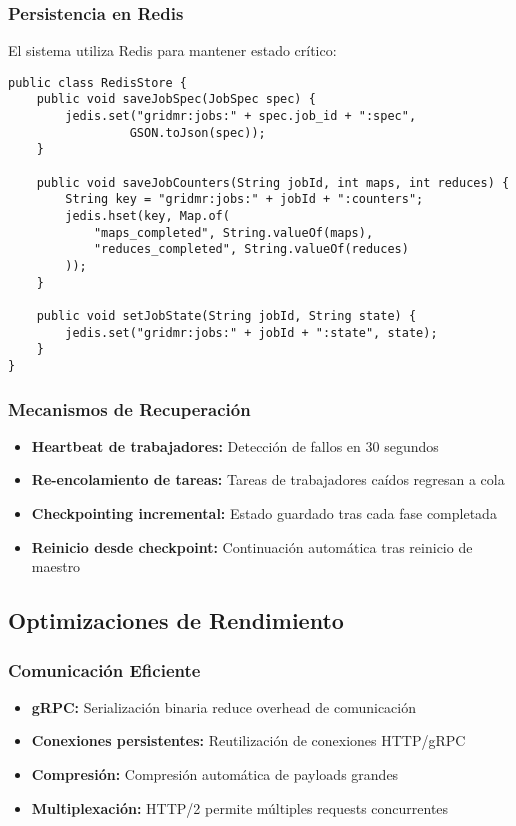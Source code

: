 \subsubsection{Persistencia en Redis}

El sistema utiliza Redis para mantener estado crítico:

\begin{verbatim}
public class RedisStore {
    public void saveJobSpec(JobSpec spec) {
        jedis.set("gridmr:jobs:" + spec.job_id + ":spec", 
                 GSON.toJson(spec));
    }
    
    public void saveJobCounters(String jobId, int maps, int reduces) {
        String key = "gridmr:jobs:" + jobId + ":counters";
        jedis.hset(key, Map.of(
            "maps_completed", String.valueOf(maps),
            "reduces_completed", String.valueOf(reduces)
        ));
    }
    
    public void setJobState(String jobId, String state) {
        jedis.set("gridmr:jobs:" + jobId + ":state", state);
    }
}
\end{verbatim}

\subsubsection{Mecanismos de Recuperación}

\begin{itemize}
    \item \textbf{Heartbeat de trabajadores:} Detección de fallos en 30 segundos
    \item \textbf{Re-encolamiento de tareas:} Tareas de trabajadores caídos regresan a cola
    \item \textbf{Checkpointing incremental:} Estado guardado tras cada fase completada
    \item \textbf{Reinicio desde checkpoint:} Continuación automática tras reinicio de maestro
\end{itemize}

\subsection{Optimizaciones de Rendimiento}

\subsubsection{Comunicación Eficiente}

\begin{itemize}
    \item \textbf{gRPC:} Serialización binaria reduce overhead de comunicación
    \item \textbf{Conexiones persistentes:} Reutilización de conexiones HTTP/gRPC
    \item \textbf{Compresión:} Compresión automática de payloads grandes
    \item \textbf{Multiplexación:} HTTP/2 permite múltiples requests concurrentes
\end{itemize}

